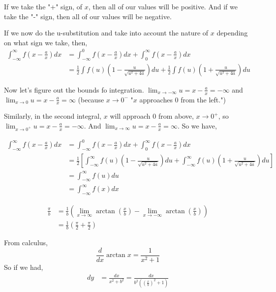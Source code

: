 If we take the "+" sign, of $x$, then all of our values will be positive.
And if we take the "-" sign, then all of our values will be negative.

If we now do the u-substitution and take into account the nature of $x$ depending on what sign we take, then,
\begin{align*}
\int_{-\infty}^{\infty} f\left(x - \frac{a}{x}\right) dx
    &= \int_{-\infty}^{0} f\left(x - \frac{a}{x}\right) dx + \int_{0}^{\infty} f\left(x - \frac{a}{x}\right) dx \\
&= \frac{1}{2} \int f(u) \left(1 - \frac{u}{\sqrt{u^2 + 4a}}\right) du
    + \frac{1}{2} \int f(u) \left(1 + \frac{u}{\sqrt{u^2 + 4a}}\right) du
\end{align*}

Now let's figure out the bounds fo integration.
$\lim_{x\rightarrow -\infty} u = x - \frac{a}{x} = -\infty$ and
$\lim_{x\rightarrow 0} u = x - \frac{a}{x} = \infty$ (because $x\rightarrow 0^-$ "$x$ approaches 0 from the left.")

Similarly, in the second integral, $x$ will approach $0$ from above, $x\rightarrow 0^+$, so
$\lim_{x\rightarrow 0^+} u = x - \frac{a}{x} = -\infty$.
And $\lim_{x\rightarrow \infty} u = x - \frac{a}{x} = \infty$.
So we have,

\begin{align*}
\int_{-\infty}^{\infty} f\left(x - \frac{a}{x}\right) dx
    &= \int_{-\infty}^{0} f\left(x - \frac{a}{x}\right) dx + \int_{0}^{\infty} f\left(x - \frac{a}{x}\right) dx \\
&= \frac{1}{2} \left[ \int_{-\infty}^{\infty} f(u) \left(1 - \frac{u}{\sqrt{u^2 + 4a}}\right) du
    + \int_{-\infty}^{\infty} f(u) \left(1 + \frac{u}{\sqrt{u^2 + 4a}}\right) du \right] \\
&= \int_{-\infty}^{\infty} f(u) du \\
&= \int_{-\infty}^{\infty} f(x) dx
\end{align*}

\begin{align*}
\frac{\pi}{b} &= \frac{1}{b}
    \left( \lim_{x\rightarrow\infty} \arctan\left(\frac{x}{b}\right) -
    \lim_{x\rightarrow -\infty} \arctan\left(\frac{x}{b}\right) \right) \\
&= \frac{1}{b} \left( \frac{\pi}{2} + \frac{\pi}{2} \right)
\end{align*}

From calculus,
$$
\frac{d}{dx} \arctan x = \frac{1}{x^2 + 1}
$$
So if we had,
\begin{align*}
dy &= \frac{dx}{x^2 + b^2} = \frac{dx}{b^2 \left( \left(\frac{x}{b}\right)^2 + 1 \right)}
\end{align*}

